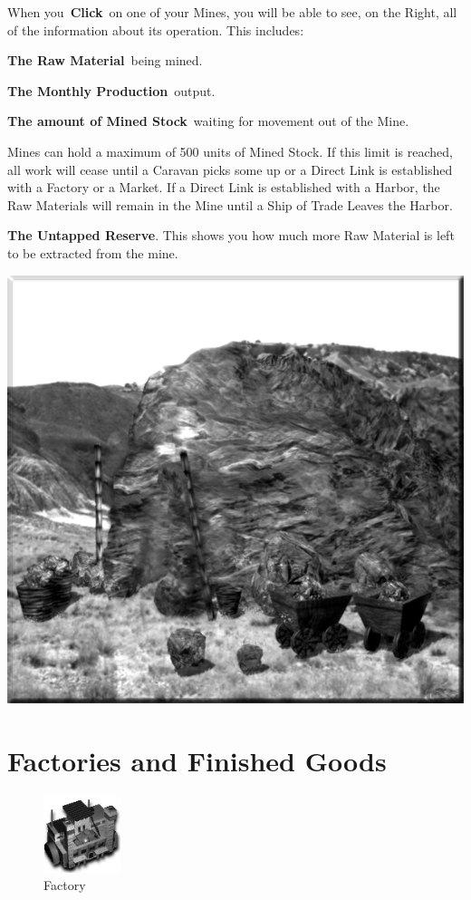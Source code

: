 When you \textbf{Click} on one of your Mines, you will be able to see, on the Right, all of the information about its operation. This includes:

\textbf{The Raw Material} being mined.

\textbf{The Monthly Production} output.

\textbf{The amount of Mined Stock} waiting for movement out of the Mine.

Mines can hold a maximum of 500 units of Mined Stock. If this limit is reached, all work will cease until a Caravan picks some up or a Direct Link is established with a Factory or a Market. If a Direct Link is established with a Harbor, the Raw Materials will remain in the Mine until a Ship of Trade Leaves the Harbor.

\textbf{The Untapped Reserve}. This shows you how much more Raw Material is left to be extracted from the mine.

\begin{center}
	\includegraphics[width=0.7\linewidth]{Amine}
\end{center}

\section{Factories and Finished Goods}

\begin{figure}
	\vspace{-20pt}
	\begin{center}
		\includegraphics[width=0.2\textwidth]{Ifactory}
		\\ Factory
	\end{center}
	\vspace{-20pt}
\end{figure}

